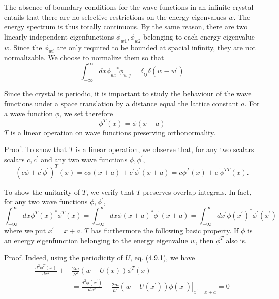 \documentclass{article}
\begin{document}
The absence of boundary conditions for the wave functions in an infinite crystal entails that there are no selective restrictions on the energy eigenvalues $w$. The energy spectrum is thus totally continuous. By the same reason, there are two linearly independent eigenfunctions $\phi_{w 1}, \phi_{w 2}$ belonging to each energy eigenvalue $w$. Since the $\phi_{w i}$ are only required to be bounded at spacial infinity, they are not normalizable. We choose to normalize them so that
$$
\begin{equation*}
\int_{-\infty}^{\infty} d x \phi_{w i}{ }^{*} \phi_{w^{\prime} j}=\delta_{i j} \delta\left(w-w^{\prime}\right) \tag{4.9.3}
\end{equation*}
$$

Since the crystal is periodic, it is important to study the behaviour of the wave functions under a space translation by a distance equal the lattice constant $a$. For a wave function $\phi$, we set therefore
$$
\begin{equation*}
\phi^{T}(x)=\phi(x+a) \tag{4.9.4}
\end{equation*}
$$
$T$ is a linear operation on wave functions preserving orthonormality.

Proof. To show that $T$ is a linear operation, we observe that, for any two scalars scalars $c, c^{\prime}$ and any two wave functions $\phi, \phi^{\prime}$,
$$
\begin{equation*}
\left(c \phi+c^{\prime} \phi^{\prime}\right)^{T}(x)=c \phi(x+a)+c^{\prime} \phi^{\prime}(x+a)=c \phi^{T}(x)+c^{\prime} \phi^{T T}(x) . \tag{4.9.5}
\end{equation*}
$$

To show the unitarity of $T$, we verify that $T$ preserves overlap integrals. In fact, for any two wave functions $\phi, \phi^{\prime}$,
$$
\begin{equation*}
\int_{-\infty}^{\infty} d x \phi^{T}(x)^{*} \phi^{T}(x)=\int_{-\infty}^{\infty} d x \phi(x+a)^{*} \phi^{\prime}(x+a)=\int_{-\infty}^{\infty} d x^{\prime} \phi\left(x^{\prime}\right)^{*} \phi^{\prime}\left(x^{\prime}\right) \tag{4.9.6}
\end{equation*}
$$
where we put $x^{\prime}=x+a$.
$T$ has furthermore the following basic property. If $\phi$ is an energy eigenfunction belonging to the energy eigenvalue $w$, then $\phi^{T}$ also is.

Proof. Indeed, using the periodicity of $U$, eq. (4.9.1), we have
$$
\begin{align*}
\frac{d^{2} \phi^{T}(x)}{d x^{2}}+ & \frac{2 m}{\hbar^{2}}(w-U(x)) \phi^{T}(x)  \tag{4.9.7}\\
& =\frac{d^{2} \phi\left(x^{\prime}\right)}{d x^{2}}+\left.\frac{2 m}{\hbar^{2}}\left(w-U\left(x^{\prime}\right)\right) \phi\left(x^{\prime}\right)\right|_{x^{\prime}=x+a}=0
\end{align*}
$$
\end{document}
